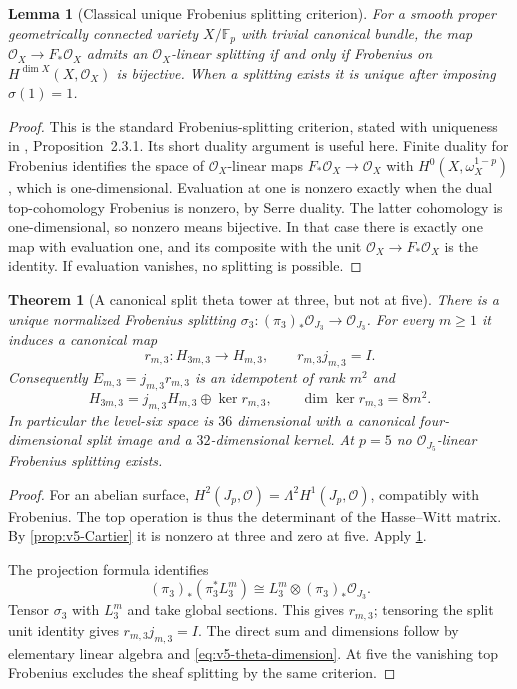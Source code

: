 \documentclass[11pt]{article}
\newtheorem{theorem}{Theorem}[section]
\newtheorem{lemma}[lemma]{Lemma}
\theoremstyle{definition}
\theoremstyle{remark}
\newcommand{\F}{\mathbb F}
\begin{document}
\begin{lemma}[Classical unique Frobenius splitting criterion]
\label{lem:v5-splitting-input}
For a smooth proper geometrically connected variety $X/\F_p$ with trivial
canonical bundle, the map $\mathcal O_X\to F_*\mathcal O_X$ admits an
$\mathcal O_X$-linear splitting if and only if Frobenius on
$H^{\dim X}(X,\mathcal O_X)$ is bijective. When a splitting exists it is
unique after imposing $\sigma(1)=1$.
\end{lemma}
\begin{proof}
This is the standard Frobenius-splitting criterion, stated with uniqueness
in \cite{AchingerZdanowicz}, Proposition~2.3.1. Its short duality argument
is useful here. Finite duality for Frobenius identifies the space of
$\mathcal O_X$-linear maps $F_*\mathcal O_X\to\mathcal O_X$ with
$H^0(X,\omega_X^{1-p})$, which is one-dimensional. Evaluation at one is
nonzero exactly when the dual top-cohomology Frobenius is nonzero, by
Serre duality. The latter cohomology is one-dimensional, so nonzero means
bijective. In that case there is exactly one map with evaluation one,
and its composite with the unit $\mathcal O_X\to F_*\mathcal O_X$ is
the identity. If evaluation vanishes, no splitting is possible.
\end{proof}

\begin{theorem}[A canonical split theta tower at three, but not at five]
\label{thm:v5-split-tower}
There is a unique normalized Frobenius splitting
$\sigma_3:(\pi_3)_*\mathcal O_{J_3}\to\mathcal O_{J_3}$. For every
$m\ge1$ it induces a canonical map
\begin{equation}
 \boxed{r_{m,3}:H_{3m,3}\longrightarrow H_{m,3},\qquad
 r_{m,3}j_{m,3}=I.}
 \label{eq:v5-retraction}
\end{equation}
Consequently $E_{m,3}=j_{m,3}r_{m,3}$ is an idempotent of rank $m^2$ and
\begin{equation}
 \boxed{H_{3m,3}=j_{m,3}H_{m,3}\oplus\ker r_{m,3},\qquad
 \dim\ker r_{m,3}=8m^2.}
 \label{eq:v5-splitting-dimension}
\end{equation}
In particular the level-six space is $36$ dimensional with a canonical
four-dimensional split image and a $32$-dimensional kernel. At $p=5$ no
$\mathcal O_{J_5}$-linear Frobenius splitting exists.
\end{theorem}
\begin{proof}
For an abelian surface,
$H^2(J_p,\mathcal O)=\Lambda^2H^1(J_p,\mathcal O)$, compatibly with
Frobenius. The top operation is thus the determinant of the Hasse--Witt
matrix. By \cref{prop:v5-Cartier} it is nonzero at three and zero at five.
Apply \cref{lem:v5-splitting-input}.

The projection formula identifies
\[
 (\pi_3)_*(\pi_3^*L_3^m)
 \cong L_3^m\otimes(\pi_3)_*\mathcal O_{J_3}.
\]
Tensor $\sigma_3$ with $L_3^m$ and take global sections. This gives
$r_{m,3}$; tensoring the split unit identity gives
$r_{m,3}j_{m,3}=I$. The direct sum and dimensions follow by elementary
linear algebra and \eqref{eq:v5-theta-dimension}. At five the vanishing
top Frobenius excludes the sheaf splitting by the same criterion.
\end{proof}
\end{document}

